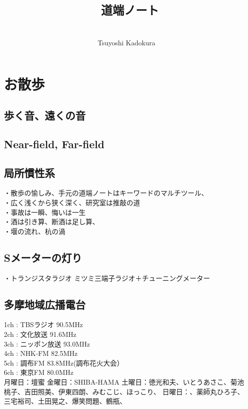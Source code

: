 \documentclass[12pt,a4paper]{jbook}
\title{
{\Huge \tt
道端ノート} \\
}
\author{
\\
\large Tsuyoshi Kadokura \\[0.5cm]
\date {}
}
\begin{document}
\maketitle
\makeatletter
\def\ps@fancy{%
\def\chaptermark##1{\markboth{\ifnum \c@secnumdepth>\z@ \thechapter\hskip 0.5em\relax \fi ##1}{}}%
\def\sectionmark##1{\markright {\ifnum \c@secnumdepth >\@ne \thesection\hskip 0.5em\relax \fi ##1}}%
\ps@@fancy
\gdef\ps@fancy{\@fancyplainfalse\ps@@fancy}%
\ifdim\headwidth<0sp
\global\advance\headwidth123456789sp\global\advance\headwidth\textwidth
\fi
}
\makeatother
\normalsize
\pagestyle{fancy}
\tableofcontents
\setcounter{page}{1}
\chapter{お散歩}
\section{歩く音、遠くの音}
\section{ Near-field, Far-field}
\section{局所慣性系}
・散歩の愉しみ、手元の道端ノートはキーワードのマルチツール、
\\
・広く浅くから狭く深く、研究室は推敲の道
\\
・事故は一瞬、悔いは一生
\\
・酒は引き算、断酒は足し算、
\\
・堰の流れ、杭の渦
\section{Sメーターの灯り}
・トランジスタラジオ
ミツミ三端子ラジオ＋チューニングメーター
\section{多摩地域広播電台}
1ch : TBSラジオ
    90.5MHz
\\
2ch : 文化放送
    91.6MHz
\\
3ch : ニッポン放送
    93.0MHz
\\
4ch : NHK-FM
    82.5MHz
\\
5ch : 調布FM
    83.8MHz(調布花火大会）
\\
6ch : 東京FM
    80.0MHz
\\
月曜日：壇蜜
金曜日：SHIBA-HAMA
土曜日：徳光和夫、いとうあさこ、菊池桃子、吉田照美、伊東四朗、みむこじ、ほっこり、
日曜日：、薬師丸ひろ子、三宅裕司、土田晃之、爆笑問題、鶴瓶、
\end{document}
